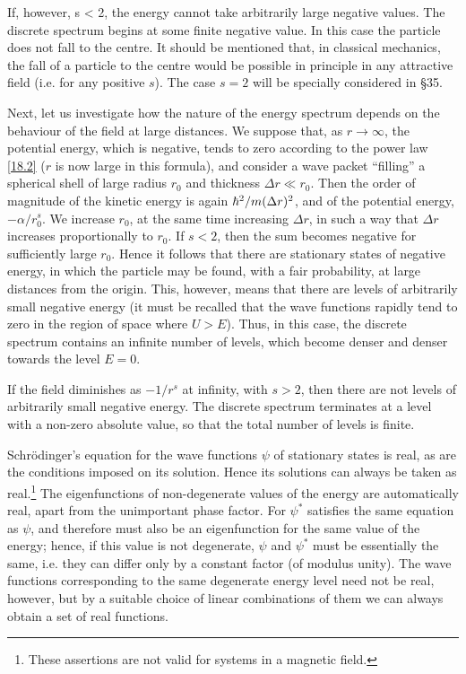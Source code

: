 If, however, s < 2, the energy cannot take arbitrarily large negative values. The discrete spectrum begins at some finite negative value. In this case the particle does not fall to the centre. It should be mentioned that, in classical mechanics, the fall of a particle to the centre would be possible in principle in any attractive field (i.e. for any positive $ s $). The case $ s = 2 $ will be specially considered in \S35.

Next, let us investigate how the nature of the energy spectrum depends on the behaviour of the field at large distances. We suppose that, as $ r\to\infty $, the potential energy, which is negative, tends to zero according to the power law \eqref{18.2} ($ r $ is now large in this formula), and consider a wave packet “filling” a spherical shell of large radius $ r_0 $ and thickness $ \Delta r\ll r_0 $. Then the order of magnitude of the kinetic energy is again $ \hbar^2/m(\Delta r)^2 $, and of the potential energy, $ -\alpha/r^s_0 $. We increase $ r_0 $, at the same time increasing $ \Delta r $, in such a way that $ \Delta r $ increases proportionally to $ r_0 $. If $ s < 2 $, then the sum becomes negative for sufficiently large $ r_0 $. Hence it follows that there are stationary states of negative energy, in which the particle may be found, with a fair probability, at large distances from the origin. This, however, means that there are levels of arbitrarily small negative energy (it must be recalled that the wave functions rapidly tend to zero in the region of space where $ U > E $). Thus, in this case, the discrete spectrum contains an infinite number of levels, which become denser and denser towards the level $ E = 0 $.

If the field diminishes as $ -1/r^s $ at infinity, with $ s>2 $, then there are not levels of arbitrarily small negative energy. The discrete spectrum terminates at a level with a non-zero absolute value, so that the total number of levels is finite.

Schr\"odinger's equation for the wave functions $\psi$ of stationary states is real, as are the conditions imposed on its solution. Hence its solutions can always be taken as real.\footnote{These assertions are not valid for systems in a magnetic field.} The eigenfunctions of non-degenerate values of the energy are automatically real, apart from the unimportant phase factor. For $\psi^*$ satisfies the same equation as $\psi$, and therefore must also be an eigenfunction for the same value of the energy; hence, if this value is not degenerate, $\psi$ and $\psi^*$ must be essentially the same, i.e. they can differ only by a constant factor (of modulus unity). The wave functions corresponding to the same degenerate energy level need not be real, however, but by a suitable choice of linear combinations of them we can always obtain a set of real functions.

